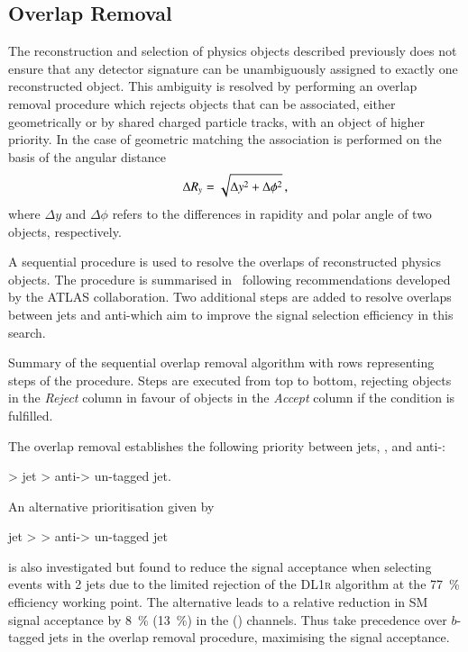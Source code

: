 \subsection{Overlap Removal}
\label{sec:overlap_removal}

The reconstruction and selection of physics objects described
previously does not ensure that any detector signature can be
unambiguously assigned to exactly one reconstructed object. This
ambiguity is resolved by performing an overlap removal procedure which
rejects objects that can be associated, either geometrically or by
shared charged particle tracks, with an object of higher priority. In
the case of geometric matching the association is performed on the
basis of the angular distance
\begin{align*}
  \Delta R_y = \sqrt{\Delta y^2 + \Delta \phi^2} \,\text{,}
\end{align*}
where $\Delta y$ and $\Delta \phi$ refers to the differences in
rapidity and polar angle of two objects, respectively.

A sequential procedure is used to resolve the overlaps of
reconstructed physics objects. The procedure is summarised
in~ following recommendations developed by
the ATLAS collaboration. Two additional steps are added to resolve
overlaps between jets and anti-\tauhadvis which aim to improve the
signal selection efficiency in this search.

\begin{table}[htbp]
  \centering


  \caption{Summary of the sequential overlap removal algorithm with
    rows representing steps of the procedure. Steps are executed from
    top to bottom, rejecting objects in the \emph{Reject} column in
    favour of objects in the \emph{Accept} column if the condition is
    fulfilled.}%
  \label{tab:overlap_removal}

  \resizebox{\textwidth}{!}{%
    
  }
\end{table}

The overlap removal establishes the following priority between jets,
\tauhadvis, and anti-\tauhadvis:
\begin{center}
  \tauhadvis > \btagged jet > anti-\tauhadvis > un-tagged jet.
\end{center}
An alternative prioritisation given by
\begin{center}
  \btagged jet > \tauhadvis > anti-\tauhadvis > un-tagged jet
\end{center}
is also investigated but found to reduce the signal acceptance when
selecting events with 2 \btagged jets due to the limited \tauhadvis
rejection of the \textsc{DL1r} \btag algorithm at the
\SI{77}{\percent} efficiency working point. The alternative leads to a
relative reduction in SM \HH signal acceptance by \SI{8}{\percent}
(\SI{13}{\percent}) in the \lephad (\hadhad) channels. Thus \tauhadvis
take precedence over $b$-tagged jets in the overlap removal procedure,
maximising the signal acceptance.

